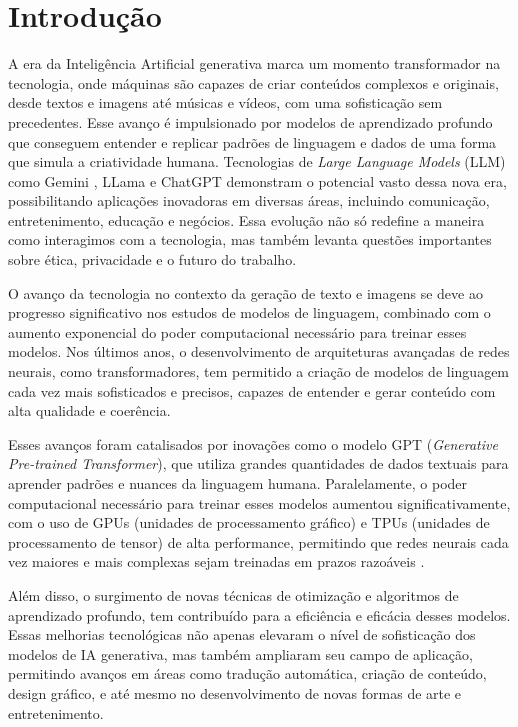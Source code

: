 \newpage
\clearpage
\section{Introdução}


A era da Inteligência Artificial generativa marca um momento transformador na tecnologia, onde máquinas são capazes de criar conteúdos complexos e originais, desde textos e imagens até músicas e vídeos, com uma sofisticação sem precedentes. Esse avanço é impulsionado por modelos de aprendizado profundo que conseguem entender e replicar padrões de linguagem e dados de uma forma que simula a criatividade humana. Tecnologias de \textit{Large Language Models} (LLM) como Gemini \cite{geminiteam2024gemini}, LLama \cite{llama3blog} e ChatGPT \cite{Liu_2023} demonstram o potencial vasto dessa nova era, possibilitando aplicações inovadoras em diversas áreas, incluindo comunicação, entretenimento, educação e negócios. Essa evolução não só redefine a maneira como interagimos com a tecnologia, mas também levanta questões importantes sobre ética, privacidade e o futuro do trabalho.

O avanço da tecnologia no contexto da geração de texto e imagens se deve ao progresso significativo nos estudos de modelos de linguagem, combinado com o aumento exponencial do poder computacional necessário para treinar esses modelos. Nos últimos anos, o desenvolvimento de arquiteturas avançadas de redes neurais, como transformadores, tem permitido a criação de modelos de linguagem cada vez mais sofisticados e precisos, capazes de entender e gerar conteúdo com alta qualidade e coerência.

Esses avanços foram catalisados por inovações como o modelo GPT (\textit{Generative Pre-trained Transformer}), que utiliza grandes quantidades de dados textuais para aprender padrões e nuances da linguagem humana. Paralelamente, o poder computacional necessário para treinar esses modelos aumentou significativamente, com o uso de GPUs (unidades de processamento gráfico) e TPUs (unidades de processamento de tensor) de alta performance, permitindo que redes neurais cada vez maiores e mais complexas sejam treinadas em prazos razoáveis \cite{wang2019benchmarkingtpugpucpu}.

Além disso, o surgimento de novas técnicas de otimização e algoritmos de aprendizado profundo, tem contribuído para a eficiência e eficácia desses modelos. Essas melhorias tecnológicas não apenas elevaram o nível de sofisticação dos modelos de IA generativa, mas também ampliaram seu campo de aplicação, permitindo avanços em áreas como tradução automática, criação de conteúdo, design gráfico, e até mesmo no desenvolvimento de novas formas de arte e entretenimento.

